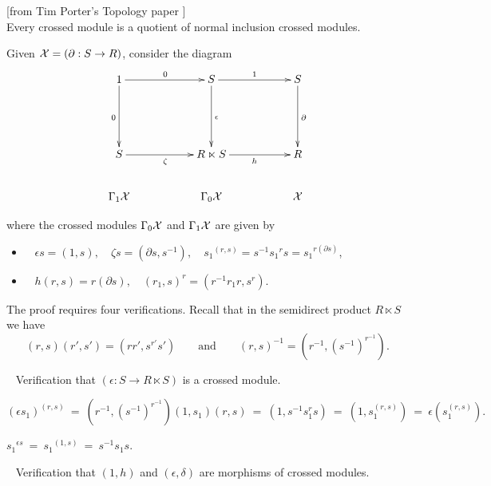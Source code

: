 \begin{thm} \label{thm:tp-top}
[from Tim Porter's Topology paper \cite{porter:top}]
\mbox{}\\
Every crossed module is a quotient of normal inclusion crossed modules.
\end{thm}
\begin{pf}
Given  $\mathcal{X} = (\partial : S \to R)$,
consider the diagram 
\begin{equation} \label{eq:tp-quotient}
\vcenter{\xy
\xymatrix{
    1 \ar[dd]_{0}  \ar[rr]^{0}
    &&    S  \ar[rr]^{1} 
             \ar[dd]^{\epsilon} 
      &&  S  \ar[dd]^{\partial}  \\
    &&&& \\
    S \ar[rr]_{\zeta}
    &&    R \ltimes S  \ar[rr]_{h}
      &&  R \\
    \Gamma_1\calX && \Gamma_0\calX && \calX \\ 
}
\endxy} 
\end{equation}

\bigskip
where the crossed modules  $\Gamma_0\mathcal{X}$ and $\Gamma_1\mathcal{X}$  are given by
\begin{itemize}
\item~ 
$\epsilon s = (1,s), \quad 
\zeta s = (\partial s, s^{-1}), \quad
{s_1}^{(r,s)} = s^{-1} {s_1}^r s = {s_1}^{r(\partial s)}$,
\item~ 
$h(r,s) = r(\partial s), \quad
(r_1,s)^r = (r^{-1}r_1r, s^r)$.
\end{itemize}

\noindent 
The proof requires four verifications. 
Recall that in the semidirect product $R \ltimes S$ we have 
\begin{equation} \label{eq:sdp-rules}
(r,s)(r',s') = (rr',s^{r'}s') \qquad \mathrm{and} \qquad 
(r,s)^{-1} = (r^{-1},(s^{-1})^{r^{-1}}). 
\end{equation}

\bigskip{}~ 
Verification that $(\epsilon : S \to R \ltimes S)$ is a crossed module.

\bigskip{}\quad
$(\epsilon s_1)^{(r,s)} ~=~  
(r^{-1},(s^{-1})^{r^{-1}})(1,s_1)(r,s) ~=~ 
(1,s^{-1}s_1^rs) ~=~ 
\left(1,s_1^{(r,s)}\right) ~=~
\epsilon\left(s_1^{(r,s)}\right).$

\bigskip{}\quad
${s_1}^{\epsilon s} ~=~ {s_1}^{(1,s)} ~=~ s^{-1}s_1s.$

\bigskip{}~ 
Verification that $(1,h)$ and $(\epsilon,\delta)$ 
are morphisms of crossed modules.


\end{pf}
